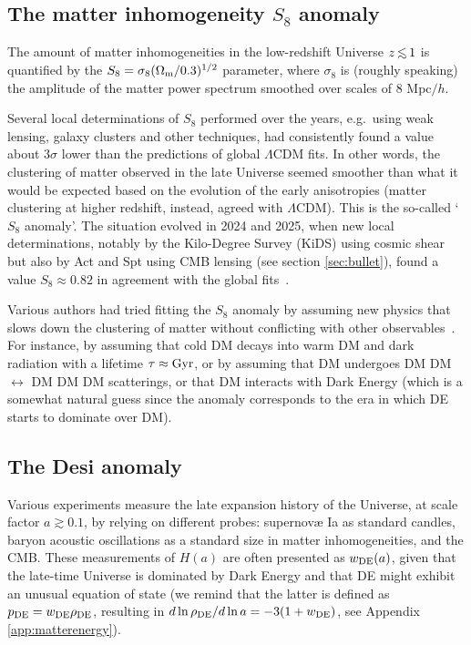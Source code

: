 \subsection{The matter inhomogeneity $S_8$ anomaly}\label{sec:S8}
The amount of matter inhomogeneities in the low-redshift Universe $z\circa{<}1$ is quantified by the $S_8 = \sigma_8(\Omega_{\rm m}/0.3)^{1/2}$ parameter, where $\sigma_8$ is (roughly speaking) the amplitude of the matter power spectrum smoothed over scales of 8 Mpc$/h$. 

Several local determinations of $S_8$ performed over the years, e.g.~using weak lensing, galaxy clusters and other techniques, had consistently found a value about $3\sigma$ lower than the predictions of global $\Lambda$CDM fits. In other words, the clustering of matter observed in the late Universe seemed smoother than what it would be expected based on the evolution of the early anisotropies (matter clustering at higher redshift, instead, agreed with $\Lambda$CDM). This is the so-called `$S_8$ anomaly'. 
The situation evolved in 2024 and 2025, when new local determinations, notably by the Kilo-Degree Survey ({\sc KiDS}) using cosmic shear but also by {\sc Act} and {\sc Spt} using CMB lensing (see section \ref{sec:bullet}), found a value $S_8 \approx 0.82$ in agreement with the global fits~\cite{S8anomaly}.

\smallskip

Various authors had tried fitting the $S_8$ anomaly by assuming new physics that slows down the clustering of matter without conflicting with other observables~\cite{S8anomaly}.
For instance, by assuming that cold DM decays into warm DM and dark radiation with a lifetime $\tau\approx{\rm Gyr}$,
or by assuming that DM undergoes DM DM $\leftrightarrow$ DM DM DM scatterings,
or that DM interacts with Dark Energy (which is a somewhat natural guess since the anomaly corresponds to the era in which DE starts to dominate over DM).


\subsection{The {\sc Desi} anomaly}\label{sec:DESIanomaly}
Various experiments measure the late expansion history of the Universe, at scale factor $a \gtrsim 0.1$,
by relying on different probes: supernov\ae{} Ia as standard candles,
baryon acoustic oscillations as a standard size in matter inhomogeneities, and the CMB.
These measurements of $H(a)$ are often presented as
$w_{\rm DE}(a)$, given that the late-time Universe is dominated by Dark Energy
and that DE might exhibit an unusual equation of state (we remind that the latter is defined as $p_{\rm DE}=w_{\rm DE}\rho_{\rm DE}$, resulting in $d\ln\rho_{\rm DE}/d\ln a = -3 (1+w_{\rm DE})$, see Appendix \ref{app:matterenergy}).


